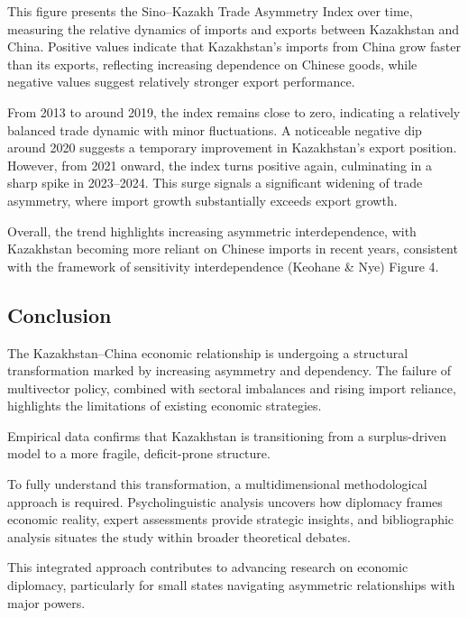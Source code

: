 \documentclass[12pt]{article}
\begin{document}
This figure presents the Sino--Kazakh Trade Asymmetry Index over time, measuring the relative dynamics of imports and exports between Kazakhstan and China. Positive values indicate that Kazakhstan’s imports from China grow faster than its exports, reflecting increasing dependence on Chinese goods, while negative values suggest relatively stronger export performance.\par
From 2013 to around 2019, the index remains close to zero, indicating a relatively balanced trade dynamic with minor fluctuations. A noticeable negative dip around 2020 suggests a temporary improvement in Kazakhstan’s export position. However, from 2021 onward, the index turns positive again, culminating in a sharp spike in 2023--2024. This surge signals a significant widening of trade asymmetry, where import growth substantially exceeds export growth.\par
Overall, the trend highlights increasing asymmetric interdependence, with Kazakhstan becoming more reliant on Chinese imports in recent years, consistent with the framework of sensitivity interdependence (Keohane \& Nye)  Figure 4.\par










\subsection{Conclusion}
The Kazakhstan--China economic relationship is undergoing a structural transformation marked by increasing asymmetry and dependency. The failure of multivector policy, combined with sectoral imbalances and rising import reliance, highlights the limitations of existing economic strategies.\par
Empirical data confirms that Kazakhstan is transitioning from a surplus-driven model to a more fragile, deficit-prone structure.\par
To fully understand this transformation, a multidimensional methodological approach is required. Psycholinguistic analysis uncovers how diplomacy frames economic reality, expert assessments provide strategic insights, and bibliographic analysis situates the study within broader theoretical debates.\par
This integrated approach contributes to advancing research on economic diplomacy, particularly for small states navigating asymmetric relationships with major powers.\par
\end{document}
